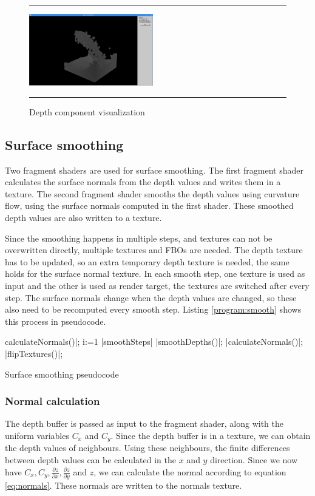 \begin{figure}[!th]
\hrule
\begin{center}
\vspace*{2ex}\includegraphics[width=0.48\textwidth]{pictures/depth.png}
\end{center}
\caption{Depth component visualization}
\label{fig:depth} 
\vspace*{2ex}
\hrule
\end{figure}

\subsection{Surface smoothing}
Two fragment shaders are used for surface smoothing.
The first fragment shader calculates the surface normals from the depth values and writes them in a texture.
The second fragment shader smooths the depth values using curvature flow, using the surface normals computed in the first shader.
These smoothed depth values are also written to a texture.

Since the smoothing happens in multiple steps, and textures can not be overwritten directly, multiple textures and FBOs are needed.
The depth texture has to be updated, so an extra temporary depth texture is needed, the same holds for the surface normal texture.
In each smooth step, one texture is used as input and the other is used as render target, the textures are switched after every step.
The surface normals change when the depth values are changed, so these also need to be recomputed every smooth step.
Listing \ref{program:smooth} shows this process in pseudocode.

\begin{algorithm}
	\begin{program}
	\caption
	|calculateNormals()|;
	\FOR i:=1 \TO |smoothSteps| \DO
		|smoothDepths()|;
		|calculateNormals()|;
		|flipTextures()|;
	\end{program}
	\label{program:smooth}
	\caption{Surface smoothing pseudocode}
\end{algorithm}

\subsubsection{Normal calculation}
The depth buffer is passed as input to the fragment shader, along with the uniform variables $C_x$ and $C_y$.
Since the depth buffer is in a texture, we can obtain the depth values of neighbours.
Using these neighbours, the finite differences between depth values can be calculated in the $x$ and $y$ direction.
Since we now have $C_x, C_y, \frac{\partial z}{\partial x}, \frac{\partial z}{\partial y}$ and $z$, we can calculate the normal according to equation \ref{eq:normals}.
These normals are written to the normals texture.

